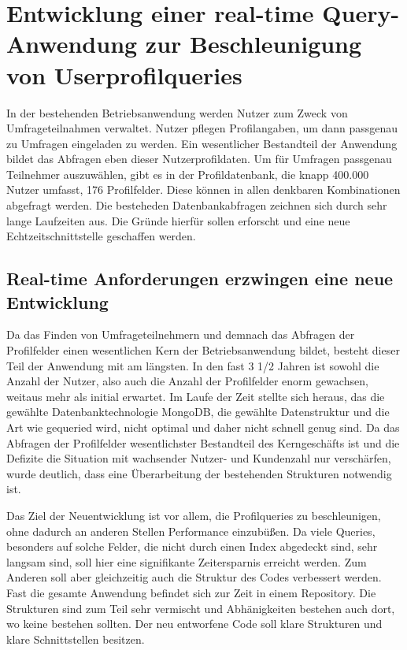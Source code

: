 \chapter{Entwicklung einer real-time Query-Anwendung zur Beschleunigung von Userprofilqueries}
In der bestehenden Betriebsanwendung werden Nutzer zum Zweck von Umfrageteilnahmen verwaltet. Nutzer pflegen Profilangaben, um dann passgenau zu Umfragen eingeladen zu werden.
Ein wesentlicher Bestandteil der Anwendung bildet das Abfragen eben dieser Nutzerprofildaten. Um für Umfragen passgenau Teilnehmer auszuwählen, gibt es in der Profildatenbank, die knapp 400.000 Nutzer umfasst, 176 Profilfelder. Diese können in allen denkbaren Kombinationen abgefragt werden. Die besteheden Datenbankabfragen zeichnen sich durch sehr lange Laufzeiten aus. Die Gründe hierfür sollen erforscht und eine neue Echtzeitschnittstelle geschaffen werden.

\section{Real-time Anforderungen erzwingen eine neue Entwicklung}
Da das Finden von Umfrageteilnehmern und demnach das Abfragen der Profilfelder einen wesentlichen Kern der Betriebsanwendung bildet, besteht dieser Teil der Anwendung mit am längsten. In den fast 3 1/2 Jahren ist sowohl die Anzahl der Nutzer, also auch die Anzahl der Profilfelder enorm gewachsen, weitaus mehr als initial erwartet. Im Laufe der Zeit stellte sich heraus, das die gewählte Datenbanktechnologie MongoDB, die gewählte Datenstruktur und die Art wie gequeried wird, nicht optimal und daher nicht schnell genug sind. Da das Abfragen der Profilfelder wesentlichster Bestandteil des Kerngeschäfts ist und die Defizite die Situation mit wachsender Nutzer- und Kundenzahl nur verschärfen, wurde deutlich, dass eine Überarbeitung der bestehenden Strukturen notwendig ist.

Das Ziel der Neuentwicklung ist vor allem, die Profilqueries zu beschleunigen, ohne dadurch an anderen Stellen Performance einzubüßen. Da viele Queries, besonders auf solche Felder, die nicht durch einen Index abgedeckt sind, sehr langsam sind, soll hier eine signifikante Zeitersparnis erreicht werden. Zum Anderen soll aber gleichzeitig auch die Struktur des Codes verbessert werden. Fast die gesamte Anwendung befindet sich zur Zeit in einem Repository. Die Strukturen sind zum Teil sehr vermischt und Abhänigkeiten bestehen auch dort, wo keine bestehen sollten. Der neu entworfene Code soll klare Strukturen und klare Schnittstellen besitzen.


